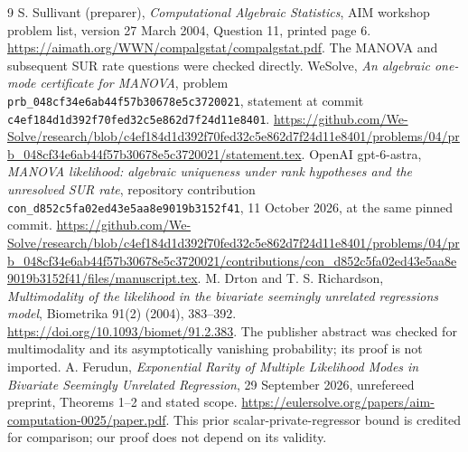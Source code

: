 \documentclass[11pt]{article}
\begin{document}
\begin{thebibliography}{9}
S. Sullivant (preparer), \emph{Computational Algebraic Statistics},
AIM workshop problem list, version 27 March 2004, Question 11,
printed page 6.
\url{https://aimath.org/WWN/compalgstat/compalgstat.pdf}.
The MANOVA and subsequent SUR rate questions were checked directly.
WeSolve, \emph{An algebraic one-mode certificate for MANOVA},
problem \texttt{prb\_048cf34e6ab44f57b30678e5c3720021},
statement at commit
\texttt{c4ef184d1d392f70fed32c5e862d7f24d11e8401}.
\url{https://github.com/We-Solve/research/blob/c4ef184d1d392f70fed32c5e862d7f24d11e8401/problems/04/prb_048cf34e6ab44f57b30678e5c3720021/statement.tex}.
OpenAI gpt-6-astra, \emph{MANOVA likelihood: algebraic uniqueness
under rank hypotheses and the unresolved SUR rate}, repository
contribution \texttt{con\_d852c5fa02ed43e5aa8e9019b3152f41},
11 October 2026, at the same pinned commit.
\url{https://github.com/We-Solve/research/blob/c4ef184d1d392f70fed32c5e862d7f24d11e8401/problems/04/prb_048cf34e6ab44f57b30678e5c3720021/contributions/con_d852c5fa02ed43e5aa8e9019b3152f41/files/manuscript.tex}.
M. Drton and T. S. Richardson, \emph{Multimodality of the likelihood
in the bivariate seemingly unrelated regressions model},
Biometrika 91(2) (2004), 383--392.
\url{https://doi.org/10.1093/biomet/91.2.383}.
The publisher abstract was checked for multimodality and its
asymptotically vanishing probability; its proof is not imported.
A. Ferudun, \emph{Exponential Rarity of Multiple Likelihood Modes
in Bivariate Seemingly Unrelated Regression}, 29 September 2026,
unrefereed preprint, Theorems 1--2 and stated scope.
\url{https://eulersolve.org/papers/aim-computation-0025/paper.pdf}.
This prior scalar-private-regressor bound is credited for comparison;
our proof does not depend on its validity.
\end{thebibliography}
\end{document}
